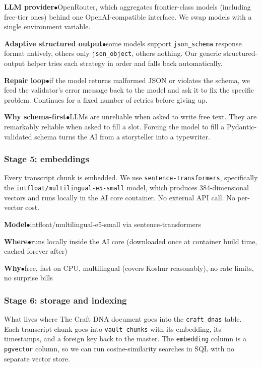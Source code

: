 \documentclass[11pt,a4paper]{article}
\newcommand{\stack}[2]{%
  \par\noindent\textbf{\color{walnut}#1}\hspace{0.5em}\textcolor{rouge}{$\bullet$}\hspace{0.5em}\textcolor{faded}{#2}\par
}
\begin{document}
\stack{LLM provider}{OpenRouter, which aggregates frontier-class models
(including free-tier ones) behind one OpenAI-compatible interface. We
swap models with a single environment variable.}
\stack{Adaptive structured output}{some models support
\texttt{json\_schema} response format natively, others only
\texttt{json\_object}, others nothing. Our generic structured-output
helper tries each strategy in order and falls back automatically.}
\stack{Repair loop}{if the model returns malformed JSON or violates the
schema, we feed the validator's error message back to the model and
ask it to fix the specific problem. Continues for a fixed number of
retries before giving up.}
\stack{Why schema-first}{LLMs are unreliable when asked to write free
text. They are remarkably reliable when asked to fill a slot. Forcing
the model to fill a Pydantic-validated schema turns the AI from a
storyteller into a typewriter.}

\subsubsection*{Stage 5: embeddings}

Every transcript chunk is embedded. We use \texttt{sentence-transformers},
specifically the \texttt{intfloat\allowbreak/multilingual\allowbreak-e5\allowbreak-small}
model, which produces 384-dimensional vectors and runs locally in the
AI core container. No external API call. No per-vector cost.

\stack{Model}{intfloat/multilingual-e5-small via sentence-transformers}
\stack{Where}{runs locally inside the AI core (downloaded once at
container build time, cached forever after)}
\stack{Why}{free, fast on CPU, multilingual (covers Koshur reasonably),
no rate limits, no surprise bills}

\subsubsection*{Stage 6: storage and indexing}

\begin{stage}{What lives where}
The Craft DNA document goes into the \texttt{craft\_dnas} table. Each
transcript chunk goes into \texttt{vault\_chunks} with its embedding,
its timestamps, and a foreign key back to the master. The
\texttt{embedding} column is a \texttt{pgvector} column, so we can run
cosine-similarity searches in SQL with no separate vector store.
\end{stage}
\end{document}
